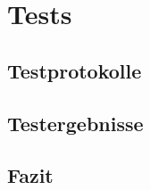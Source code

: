\chapter{Tests}

\section{Testprotokolle}
\Blindtext[2][3] 
\blinditemize

\section {Testergebnisse}

\section{Fazit}